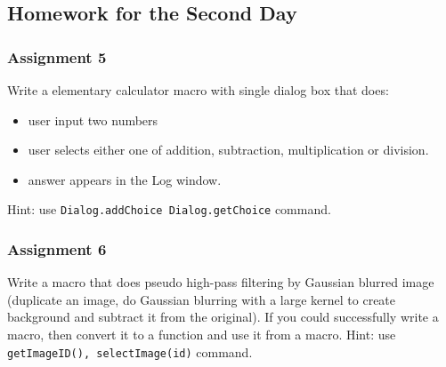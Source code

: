 \documentclass[11pt,a4paper,oneside]{report}
\newcommand{\ilcom}[1]{\texttt{\small#1}}
\begin{document}
\subsection{Homework for the Second Day}

\subsubsection{Assignment 5}
Write a elementary calculator macro with single dialog box that does:
\begin{itemize}
\item user input two numbers
\item user selects either one of addition, subtraction, multiplication or division. 
\item answer appears in the Log window. 
 \end{itemize}
Hint: use \ilcom{Dialog.addChoice Dialog.getChoice} command.   

\subsubsection{Assignment 6}
Write a macro that does pseudo high-pass filtering by Gaussian blurred image
(duplicate an image, do Gaussian blurring with a large kernel to create
background and subtract it from the original). If you could successfully write a
macro, then convert it to a function and use it from a macro.
Hint: use \ilcom{getImageID(), selectImage(id)} command.   
\end{document}
